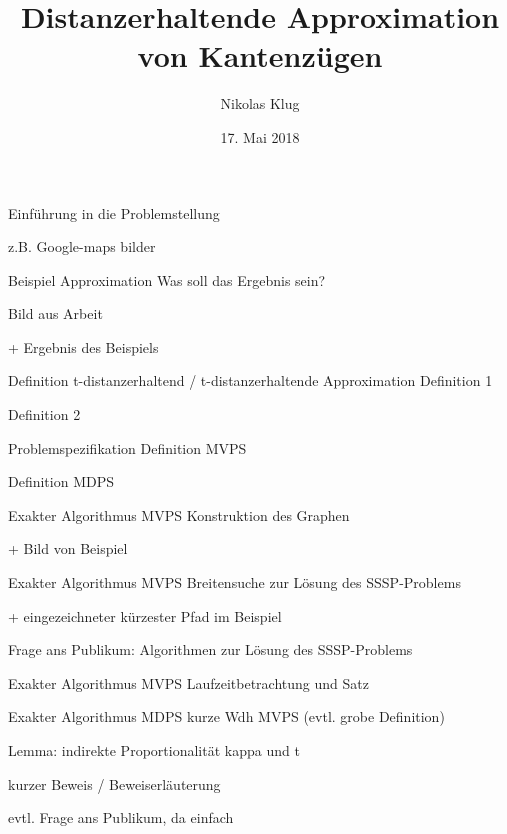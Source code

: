 \documentclass{beamer}
\title[Distanzerhaltende Approximation]{Distanzerhaltende Approximation von Kantenzügen}
\author[N. Klug]{Nikolas Klug}
\institute[Uni Augburg]{Universität Augsburg}
\date{17. Mai 2018}
\begin{document}
	\frame{\titlepage}
	
	\begin{frame}{Einführung in die Problemstellung}
		
		z.B. Google-maps bilder
		
	\end{frame}
	
	\begin{frame}{Beispiel Approximation}
		Was soll das Ergebnis sein?
		
		Bild aus Arbeit
		
		 + Ergebnis des Beispiels
	\end{frame}
	
	\begin{frame}{Definition t-distanzerhaltend / t-distanzerhaltende Approximation}
		Definition 1
		
		Definition 2
	\end{frame}
	
	\begin{frame}{Problemspezifikation}
		Definition MVPS
		
		Definition MDPS
	\end{frame}
	
	\begin{frame}{Exakter Algorithmus MVPS}
		Konstruktion des Graphen
		
		+ Bild von Beispiel
		
	\end{frame}
	
	\begin{frame}{Exakter Algorithmus MVPS}
		Breitensuche zur Lösung des SSSP-Problems
		
		+ eingezeichneter kürzester Pfad im Beispiel
		
		Frage ans Publikum: Algorithmen zur Lösung des SSSP-Problems
	\end{frame}
	
	\begin{frame}{Exakter Algorithmus MVPS}
		Laufzeitbetrachtung und Satz
	\end{frame}
	
	\begin{frame}{Exakter Algorithmus MDPS}
		kurze Wdh MVPS (evtl. grobe Definition)
		
		Lemma: indirekte Proportionalität kappa und t
		
		kurzer Beweis / Beweiserläuterung
		
		evtl. Frage ans Publikum, da einfach
	\end{frame}
	
\end{document}
